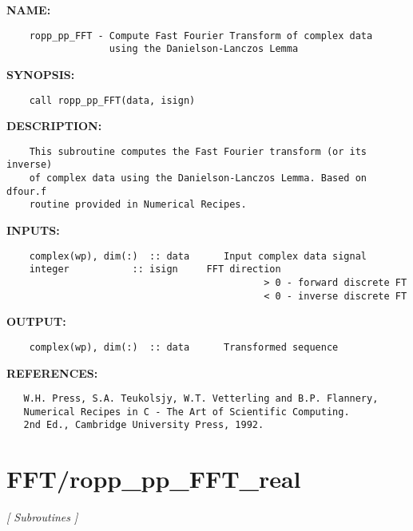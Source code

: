 \label{ch:robo13}
\label{ch:FFT_ropp_pp_FFT_complex}
\textbf{NAME:}\hspace{0.08in}\begin{Verbatim}
    ropp_pp_FFT - Compute Fast Fourier Transform of complex data
                  using the Danielson-Lanczos Lemma
\end{Verbatim}
\textbf{SYNOPSIS:}\hspace{0.08in}\begin{Verbatim}
    call ropp_pp_FFT(data, isign)
\end{Verbatim}
\textbf{DESCRIPTION:}\hspace{0.08in}\begin{Verbatim}
    This subroutine computes the Fast Fourier transform (or its inverse)
    of complex data using the Danielson-Lanczos Lemma. Based on dfour.f
    routine provided in Numerical Recipes.
\end{Verbatim}
\textbf{INPUTS:}\hspace{0.08in}\begin{Verbatim}
    complex(wp), dim(:)  :: data      Input complex data signal
    integer           :: isign     FFT direction
                                             > 0 - forward discrete FT
                                             < 0 - inverse discrete FT
\end{Verbatim}
\textbf{OUTPUT:}\hspace{0.08in}\begin{Verbatim}
    complex(wp), dim(:)  :: data      Transformed sequence
\end{Verbatim}
\textbf{REFERENCES:}\hspace{0.08in}\begin{Verbatim}
   W.H. Press, S.A. Teukolsjy, W.T. Vetterling and B.P. Flannery,
   Numerical Recipes in C - The Art of Scientific Computing.
   2nd Ed., Cambridge University Press, 1992.
\end{Verbatim}
\section{FFT/ropp\_pp\_FFT\_real}
\textsl{[ Subroutines ]}

